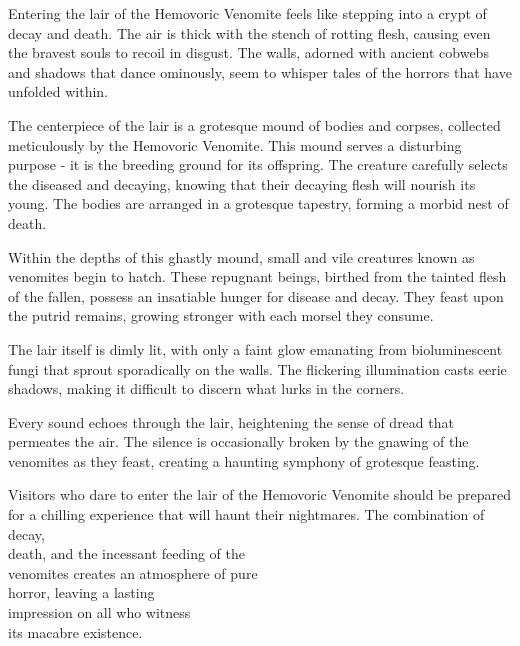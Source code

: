 \documentclass[letterpaper,openany,twoside,twocolumn]{book}
\begin{document}
Entering the lair of the Hemovoric Venomite feels like stepping into a crypt of decay and death. The air is thick with the stench of rotting flesh, causing even the bravest souls to recoil in disgust. The walls, adorned with ancient cobwebs and shadows that dance ominously, seem to whisper tales of the horrors that have unfolded within.

The centerpiece of the lair is a grotesque mound of bodies and corpses, collected meticulously by the Hemovoric Venomite. This mound serves a disturbing purpose - it is the breeding ground for its offspring. The creature carefully selects the diseased and decaying, knowing that their decaying flesh will nourish its young. The bodies are arranged in a grotesque tapestry, forming a morbid nest of death.

Within the depths of this ghastly mound, small and vile creatures known as venomites begin to hatch. These repugnant beings, birthed from the tainted flesh of the fallen, possess an insatiable hunger for disease and decay. They feast upon the putrid remains, growing stronger with each morsel they consume.

The lair itself is dimly lit, with only a faint glow emanating from bioluminescent fungi that sprout sporadically on the walls. The flickering illumination casts eerie shadows, making it difficult to discern what lurks in the corners.

Every sound echoes through the lair, heightening the sense of dread that permeates the air. The silence is occasionally broken by the gnawing of the venomites as they feast, creating a haunting symphony of grotesque feasting.

\newcommand{\blocktextlinebreak}{~~~~~~~~~~~~~~~~~~~\vspace*{-1.2\fontdimen6\font}\\}
Visitors who dare to enter the lair of the Hemovoric Venomite should be prepared for a chilling experience that will haunt their nightmares. The combination of decay, \blocktextlinebreak\hspace*{1.75cm}death, and the incessant feeding of the \blocktextlinebreak\hspace*{2.5cm}venomites creates an atmosphere of pure \blocktextlinebreak\hspace*{4cm} horror, leaving a lasting \blocktextlinebreak\hspace*{4.5cm} impression on all who witness \blocktextlinebreak\hspace*{5cm} its macabre existence. \blocktextlinebreak

\vspace*{-18.75cm}\hspace*{6.5cm}%
\end{document}
